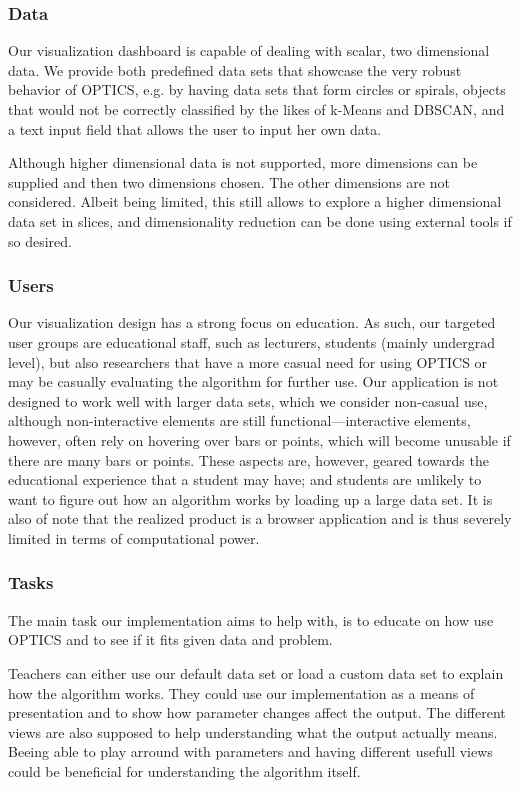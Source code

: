 \documentclass{vgtc}                          %
\begin{document}
\subsubsection{Data}

Our visualization dashboard is capable of dealing with scalar, two dimensional
data. We provide both predefined data sets that showcase the very robust
behavior of OPTICS, e.g. by having data sets that form circles or spirals,
objects that would not be correctly classified by the likes of k-Means and
DBSCAN, and a text input field that allows the user to input her own data.

Although higher dimensional data is not supported, more dimensions can be
supplied and then two dimensions chosen. The other dimensions are not
considered. Albeit being limited, this still allows to explore a higher
dimensional data set in slices, and dimensionality reduction can be done
using external tools if so desired.


\subsubsection{Users}

Our visualization design has a strong focus on education. As such, our targeted
user groups are educational staff, such as lecturers, students (mainly
undergrad level), but also researchers that have a more casual need for using
OPTICS or may be casually evaluating the algorithm for further use. Our
application is not designed to work well with larger data sets, which we
consider non-casual use, although non-interactive elements are still
functional---interactive elements, however, often rely on hovering over bars or
points, which will become unusable if there are many bars or points. These
aspects are, however, geared towards the educational experience that a student
may have; and students are unlikely to want to figure out how an algorithm
works by loading up a large data set. It is also of note that the realized
product is a browser application and is thus severely limited in terms of
computational power.


\subsubsection{Tasks}

The main task our implementation aims to help with, is to educate on how use OPTICS and to see if it fits given data and problem.

Teachers can either use our default data set or load a custom data set to explain how the algorithm works. They could use our implementation as a means of presentation and to show how parameter changes affect the output. The different views are also supposed to help understanding what the output actually means. Beeing able to play arround with parameters and having different usefull views could be beneficial for understanding the algorithm itself.
\end{document}
